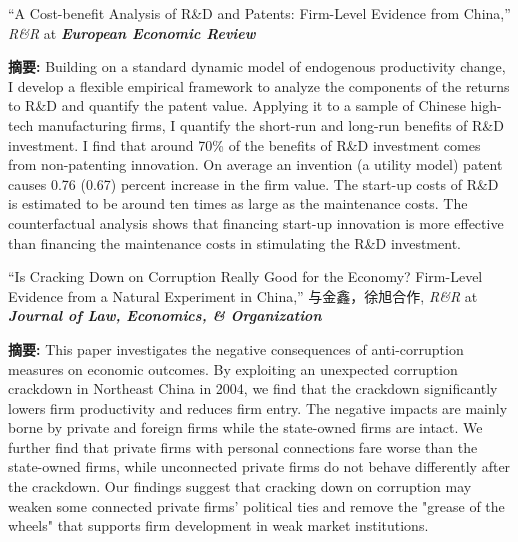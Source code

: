 \documentclass[letterpaper]{article}
\begin{document}
{“A Cost-benefit Analysis of R\&D and Patents: Firm-Level Evidence from China,” \textit{R\&R} at \textbf{\textit {European Economic Review}}
 \vspace{0.05in}
 \begin{center}
 \begin{minipage}{0.9\linewidth}
   \textbf{摘要:} Building on a standard dynamic model of endogenous productivity change, I develop a flexible empirical framework to analyze the components of the returns to R\&D and quantify the patent value. Applying it to a sample of Chinese high-tech manufacturing firms, I quantify the short-run
and long-run benefits of R\&D investment. I find that around 70\% of the benefits of R\&D investment comes from non-patenting innovation. On average an invention (a utility model) patent causes 0.76 (0.67) percent increase in the firm value. The start-up costs of R\&D is estimated to be around ten times as large as the maintenance costs. The counterfactual analysis shows that financing start-up innovation is more effective than financing the maintenance costs in stimulating the R\&D investment.
 \end{minipage}
 \end{center}
 \vspace{0.05in}
 “Is Cracking Down on Corruption Really Good for the Economy? Firm-Level Evidence from a Natural Experiment in China,” 与金鑫，徐旭合作, \textit{R\&R} at \textbf{\textit{Journal of Law, Economics, \& Organization}}
  \vspace{0.05in}
 \begin{center}
 \begin{minipage}{0.9\linewidth}
   \textbf{摘要:} This paper investigates the negative consequences of anti-corruption measures on economic outcomes. By exploiting an unexpected corruption crackdown in Northeast China in 2004, we find that the crackdown significantly lowers firm productivity and reduces firm entry. The negative impacts are mainly borne by private and foreign firms while the state-owned firms are intact. We further find that private firms with personal connections fare worse than the state-owned firms, while unconnected private firms do not behave differently after the crackdown. Our findings suggest that cracking down on corruption may weaken some connected private firms' political ties and remove the "grease of the wheels" that supports firm development in weak market institutions.
 \end{minipage}
 \end{center}
 \vspace{0.05in}
}
\end{document}
